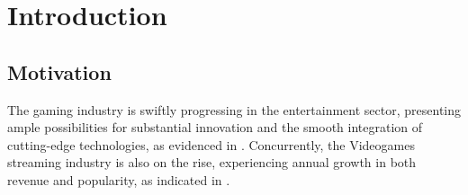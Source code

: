 
%

\chapter{Introduction}
\label{cha:introduction}


\epigraphfontsize{\small\itshape}
\setlength\epigraphwidth{12.5cm}
\setlength\epigraphrule{0pt}




\section{Motivation}
The gaming industry is swiftly progressing in the entertainment sector, presenting ample possibilities for substantial innovation and the smooth integration of cutting-edge technologies, as evidenced in \cite{VideogamesDataSurvey}. Concurrently, the Videogames streaming industry is also on the rise, experiencing annual growth in both revenue and popularity, as indicated in \cite{TwitchRevenue2023} \cite{TwitchAudience} \cite{COVID-19Pandemic_on_Live-Stream_Broadcasters_Twitch}.


